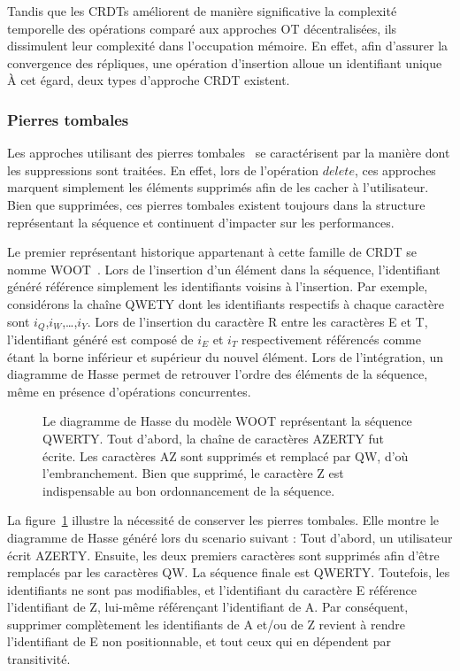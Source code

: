 Tandis que les CRDTs améliorent de manière significative la complexité
temporelle des opérations comparé aux approches OT décentralisées, ils
dissimulent leur complexité dans l'occupation mémoire. En effet, afin d'assurer
la convergence des répliques, une opération d'insertion alloue un identifiant
unique  À cet égard, deux types d'approche CRDT existent.

\subsubsection{Pierres tombales}

Les approches utilisant des pierres tombales~\cite{ahmed2011evaluating,
  conway2014language, grishchenko2010deep, oster2006data,
  preguica2009commutative, roh2011replicated, weiss2007wooki, wu2010partial,
  Yu2012stringwise} se caractérisent par la manière dont les suppressions sont
traitées. En effet, lors de l'opération $delete$, ces approches marquent
simplement les éléments supprimés afin de les cacher à l'utilisateur. Bien que
supprimées, ces pierres tombales existent toujours dans la structure
représentant la séquence et continuent d'impacter sur les performances.

Le premier représentant historique appartenant à cette famille de CRDT se nomme
WOOT~\cite{oster2006data}. Lors de l'insertion d'un élément dans la séquence,
l'identifiant généré référence simplement les identifiants voisins à
l'insertion. Par exemple, considérons la chaîne QWETY dont les identifiants
respectifs à chaque caractère sont $i_Q$,$i_W$,\ldots,$i_Y$. Lors de l'insertion
du caractère R entre les caractères E et T, l'identifiant généré est composé de
$i_E$ et $i_T$ respectivement référencés comme étant la borne inférieur et
supérieur du nouvel élément. Lors de l'intégration, un diagramme de Hasse permet
de retrouver l'ordre des éléments de la séquence, même en présence d'opérations
concurrentes. 

\begin{figure}
  \centering
  
  \caption{\label{fig:lseq:wootexample}Le diagramme de Hasse du modèle WOOT
    représentant la séquence QWERTY. Tout d'abord, la chaîne de caractères
    AZERTY fut écrite. Les caractères AZ sont supprimés et remplacé par QW, d'où
    l'embranchement. Bien que supprimé, le caractère Z est indispensable au bon
    ordonnancement de la séquence.}
\end{figure}

La figure~\ref{fig:lseq:wootexample} illustre la nécessité de conserver les
pierres tombales. Elle montre le diagramme de Hasse généré lors du scenario
suivant : Tout d'abord, un utilisateur écrit AZERTY. Ensuite, les deux premiers
caractères sont supprimés afin d'être remplacés par les caractères QW. La
séquence finale est QWERTY. Toutefois, les identifiants ne sont pas modifiables,
et l'identifiant du caractère E référence l'identifiant de Z, lui-même
référençant l'identifiant de A. Par conséquent, supprimer complètement les
identifiants de A et/ou de Z revient à rendre l'identifiant de E non
positionnable, et tout ceux qui en dépendent par transitivité.

